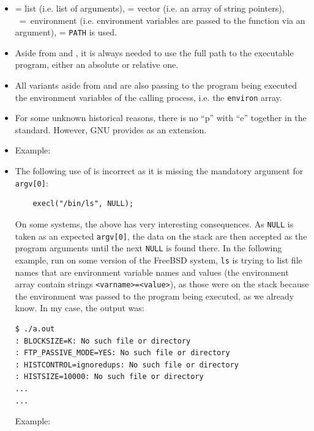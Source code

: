 \begin{itemize}
\item {} = list (i.e. list of arguments),  = vector (i.e.  an array
of string pointers), ~=~environment (i.e. environment variables are
passed to the function via an argument),  = \texttt{PATH} is used.
\item Aside from  and , it is always needed to use
the full path to the executable program, either an absolute or relative one.
\item All variants aside from  and 
are also passing to the program being executed the environment variables of the
calling process, i.e. the \texttt{environ} array.
\item For some unknown historical reasons, there is no ``p'' with ``e'' together
in the standard.  However, GNU provides  as an extension.
\item \label{EXEC_DATE} Example: 
\item \label{EXECL} The following use of  is incorrect as it is
missing the mandatory argument for \texttt{argv[0]}:

\begin{verbatim}
	execl("/bin/ls", NULL);
\end{verbatim}

On some systems, the above has very interesting consequences.  As \texttt{NULL}
is taken as an expected \texttt{argv[0]}, the data on the stack are then
accepted as the program arguments until the next \texttt{NULL} is found there.
In the following example, run on some version of the FreeBSD system, \texttt{ls}
is trying to list file names that are environment variable names and values (the
environment array contain strings \texttt{<varname>=<value>}), as those were on
the stack because the environment was passed to the program being executed, as
we already know.  In my case, the output was:

\begin{verbatim}
$ ./a.out 
: BLOCKSIZE=K: No such file or directory
: FTP_PASSIVE_MODE=YES: No such file or directory
: HISTCONTROL=ignoredups: No such file or directory
: HISTSIZE=10000: No such file or directory
...
...
\end{verbatim}

Example: 
\end{itemize}


